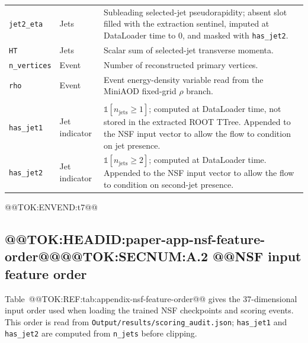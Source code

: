 \documentclass[11pt]{article}
\begin{document}
\begin{table}[t]
\begin{tabular}{>{\raggedright\arraybackslash}p{}>{\raggedright\arraybackslash}p{}>{\raggedright\arraybackslash}p{}}
\texttt{jet2\_eta} & Jets & Subleading selected-jet pseudorapidity; absent slot filled with the extraction sentinel, imputed at DataLoader time to \(0\), and masked with \texttt{has\_jet2}. \\
\texttt{HT} & Jets & Scalar sum of selected-jet transverse momenta. \\
\texttt{n\_vertices} & Event & Number of reconstructed primary vertices. \\
\texttt{rho} & Event & Event energy-density variable read from the MiniAOD fixed-grid \(\rho\) branch. \\
\midrule
\multicolumn{3}{l}{DataLoader-computed features:} \\
\texttt{has\_jet1} & Jet indicator & \(\mathbb{1}[n_\mathrm{jets}\ge 1]\); computed at DataLoader time, not stored in the extracted ROOT TTree. Appended to the NSF input vector to allow the flow to condition on jet presence. \\
\texttt{has\_jet2} & Jet indicator & \(\mathbb{1}[n_\mathrm{jets}\ge 2]\); computed at DataLoader time. Appended to the NSF input vector to allow the flow to condition on second-jet presence. \\
\bottomrule
\end{tabular}
@@TOK:ENVEND:t7@@\end{table}

\subsection{@@TOK:HEADID:paper-app-nsf-feature-order@@@@TOK:SECNUM:A.2 @@NSF input feature order}

Table~@@TOK:REF:tab:appendix-nsf-feature-order@@ gives the 37-dimensional input order used when
loading the trained NSF checkpoints and scoring events. This order is read from
\texttt{Output/results/scoring\_audit.json}; \texttt{has\_jet1} and \texttt{has\_jet2}
are computed from \texttt{n\_jets} before clipping.
\end{document}
